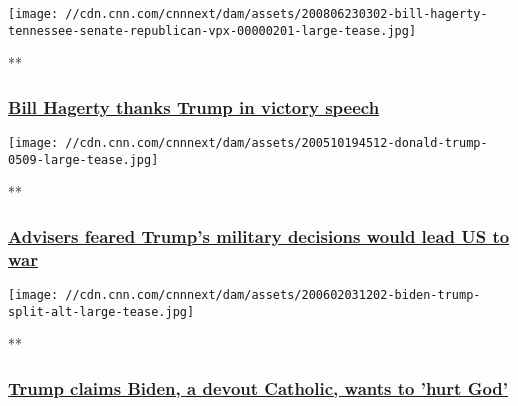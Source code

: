 \href{/videos/politics/2020/08/07/bill-hagerty-tennessee-senate-republican-vpx.wztv/video/playlists/this-week-in-politics/}{}

\texttt{[image: //cdn.cnn.com/cnnnext/dam/assets/200806230302-bill-hagerty-tennessee-senate-republican-vpx-00000201-large-tease.jpg]}

**

\hypertarget{bill-hagerty-thanks-trump-in-victory-speech}{%
\subsubsection{\texorpdfstring{\href{/videos/politics/2020/08/07/bill-hagerty-tennessee-senate-republican-vpx.wztv/video/playlists/this-week-in-politics/}{Bill
Hagerty thanks Trump in victory
speech}}{Bill Hagerty thanks Trump in victory speech}}\label{bill-hagerty-thanks-trump-in-victory-speech}}

\href{/videos/politics/2020/08/06/trump-advisers-military-fears-sciutto-vpx.cnn/video/playlists/this-week-in-politics/}{}

\texttt{[image: //cdn.cnn.com/cnnnext/dam/assets/200510194512-donald-trump-0509-large-tease.jpg]}

**

\hypertarget{advisers-feared-trumps-military-decisions-would-lead-us-to-war}{%
\subsubsection{\texorpdfstring{\href{/videos/politics/2020/08/06/trump-advisers-military-fears-sciutto-vpx.cnn/video/playlists/this-week-in-politics/}{Advisers
feared Trump's military decisions would lead US to
war}}{Advisers feared Trump's military decisions would lead US to war}}\label{advisers-feared-trumps-military-decisions-would-lead-us-to-war}}

\href{/videos/politics/2020/08/06/joe-biden-hurt-god-donald-trump-sot-diamond-lklv-lead-vpx.cnn/video/playlists/this-week-in-politics/}{}

\texttt{[image: //cdn.cnn.com/cnnnext/dam/assets/200602031202-biden-trump-split-alt-large-tease.jpg]}

**

\hypertarget{trump-claims-biden-a-devout-catholic-wants-to-hurt-god}{%
\subsubsection{\texorpdfstring{\href{/videos/politics/2020/08/06/joe-biden-hurt-god-donald-trump-sot-diamond-lklv-lead-vpx.cnn/video/playlists/this-week-in-politics/}{Trump
claims Biden, a devout Catholic, wants to 'hurt
God'}}{Trump claims Biden, a devout Catholic, wants to 'hurt God'}}\label{trump-claims-biden-a-devout-catholic-wants-to-hurt-god}}

